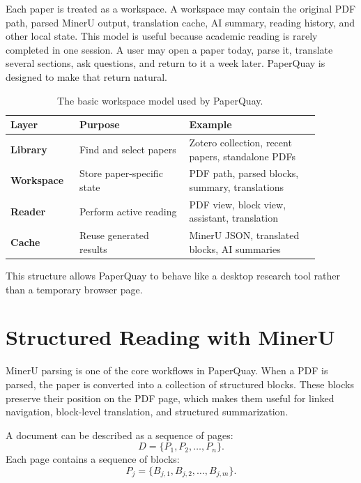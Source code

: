 ﻿\documentclass[11pt,a4paper]{article}
\begin{document}
Each paper is treated as a workspace. A workspace may contain the original PDF path, parsed MinerU output, translation cache, AI summary, reading history, and other local state. This model is useful because academic reading is rarely completed in one session. A user may open a paper today, parse it, translate several sections, ask questions, and return to it a week later. PaperQuay is designed to make that return natural.

\begin{table}[h]
\centering
\begin{tabular}{>{\bfseries}p{0.18\linewidth}p{0.32\linewidth}p{0.38\linewidth}}
\toprule
Layer & Purpose & Example \\
\midrule
Library & Find and select papers & Zotero collection, recent papers, standalone PDFs \\
Workspace & Store paper-specific state & PDF path, parsed blocks, summary, translations \\
Reader & Perform active reading & PDF view, block view, assistant, translation \\
Cache & Reuse generated results & MinerU JSON, translated blocks, AI summaries \\
\bottomrule
\end{tabular}
\caption{The basic workspace model used by PaperQuay.}
\end{table}

This structure allows PaperQuay to behave like a desktop research tool rather than a temporary browser page.

\section{Structured Reading with MinerU}

MinerU parsing is one of the core workflows in PaperQuay. When a PDF is parsed, the paper is converted into a collection of structured blocks. These blocks preserve their position on the PDF page, which makes them useful for linked navigation, block-level translation, and structured summarization.

A document can be described as a sequence of pages:
\begin{equation}
D = \{P_1, P_2, \ldots, P_n\}.
\end{equation}
Each page contains a sequence of blocks:
\begin{equation}
P_j = \{B_{j,1}, B_{j,2}, \ldots, B_{j,m}\}.
\end{equation}
\end{document}

